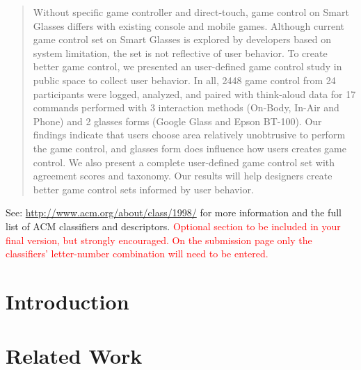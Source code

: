 \documentclass{sigchi}
\begin{document}
\begin{abstract}
Without specific game controller and direct-touch, game control on Smart Glasses differs with existing console and mobile games. Although current game control set on Smart Glasses is explored by developers based on system limitation, the set is not reflective of user behavior.
To create better game control, we presented an user-defined game control study in public space to collect user behavior. In all, 2448 game control from 24 participants were logged, analyzed, and paired with think-aloud data for 17 commands performed with 3 interaction methods (On-Body, In-Air and Phone) and 2 glasses forms (Google Glass and Epson BT-100). 
Our findings indicate that users choose area relatively unobtrusive to perform the game control, and glasses form does influence how users creates game control. We also present a complete user-defined game control set with agreement scores and taxonomy. 
Our results will help designers create better game control sets informed by user behavior.
\end{abstract}



See: \url{http://www.acm.org/about/class/1998/}
for more information and the full list of ACM classifiers
and descriptors. \newline
\textcolor{red}{Optional section to be included in your final version, 
but strongly encouraged. On the submission page only the classifiers’ 
letter-number combination will need to be entered.}

\section{Introduction}



\section{Related Work}
\end{document}
